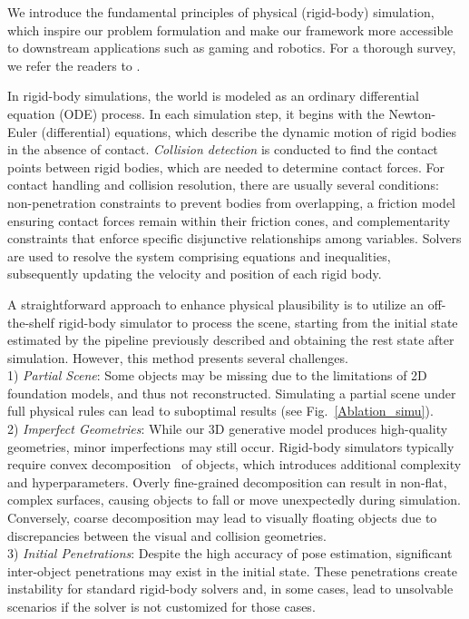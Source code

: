 We introduce the fundamental principles of physical (rigid-body) simulation, which inspire our problem formulation and make our framework more accessible to downstream applications such as gaming and robotics. For a thorough survey, we refer the readers to \cite{BenderETC12}. %

In rigid-body simulations, the world is modeled as an ordinary differential equation (ODE) process. In each simulation step, it begins with the Newton-Euler (differential) equations, which describe the dynamic motion of rigid bodies in the absence of contact. \emph{Collision detection} is conducted to find the contact points between rigid bodies, which are needed to determine contact forces. For contact handling and collision resolution, there are usually several conditions: non-penetration constraints to prevent bodies from overlapping, a friction model ensuring contact forces remain within their friction cones, and complementarity constraints that enforce specific disjunctive relationships among variables. Solvers are used to resolve the system comprising equations and inequalities, subsequently updating the velocity and position of each rigid body.

A straightforward approach to enhance physical plausibility is to utilize an off-the-shelf rigid-body simulator to process the scene, starting from the initial state estimated by the pipeline previously described and obtaining the rest state after simulation. However, this method presents several challenges.
\\ 1) \emph{Partial Scene}: Some objects may be missing due to the limitations of 2D foundation models, and thus not reconstructed. Simulating a partial scene under full physical rules can lead to suboptimal results (see Fig.~\ref{Ablation_simu}). 
\\2) \emph{Imperfect Geometries}: While our 3D generative model produces high-quality geometries, minor imperfections may still occur. Rigid-body simulators typically require convex decomposition~\cite{mamou2009simple,mamou2016volumetric,wei2022approximate} of objects, which introduces additional complexity and hyperparameters. Overly fine-grained decomposition can result in non-flat, complex surfaces, causing objects to fall or move unexpectedly during simulation. Conversely, coarse decomposition may lead to visually floating objects due to discrepancies between the visual and collision geometries.
\\3) \emph{Initial Penetrations}: Despite the high accuracy of pose estimation, significant inter-object penetrations may exist in the initial state. These penetrations create instability for standard rigid-body solvers and, in some cases, lead to unsolvable scenarios if the solver is not customized for those cases.

